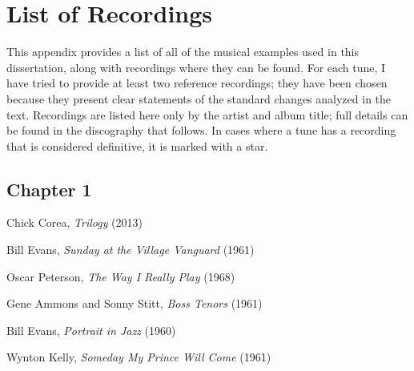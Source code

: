 \chapter*{List of Recordings}

%
%
This appendix provides a list of all of the musical examples used in this
dissertation, along with recordings where they can be found. For each tune, I
have tried to provide at least two reference recordings; they have been
chosen because they present clear statements of the standard changes analyzed
in the text. Recordings are listed here only by the artist and album title;
full details can be found in the discography that follows. In cases where a
tune has a recording that is considered definitive, it is marked with a star.

\section*{Chapter 1}

\vspace{-1em}

\begin{compactitem}
    \item Chick Corea, \emph{Trilogy} (2013)
    \item Bill Evans, \emph{Sunday at the Village Vanguard} (1961)
    \item Oscar Peterson, \emph{The Way I Really Play} (1968)
\end{compactitem}
\nocite{corea:trilogy,evans:sunday,peterson:reallyplay}


\begin{compactitem}
    \item Gene Ammons and Sonny Stitt, \emph{Boss Tenors} (1961)
    \item Bill Evans, \emph{Portrait in Jazz} (1960)
    \item Wynton Kelly, \emph{Someday My Prince Will Come} (1961)
\end{compactitem}
\nocite{ammons:stitt,evans:portrait,kelly:someday}

